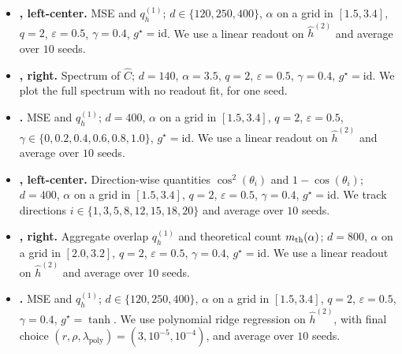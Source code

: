\documentclass[]{article}
\numberwithin{equation}{section}
\theoremstyle{definition}
\begin{document}
\begin{itemize}
    \setlength{\itemsep}{2pt}
    \setlength{\parsep}{0pt}
    \setlength{\topsep}{2pt}
    \setlength{\partopsep}{0pt}

    \item \textbf{, left-center.}
    MSE and $q_h^{(1)}$; $d\in\{120,250,400\}$, $\alpha$ on a grid in $[1.5,3.4]$,
    $q=2$, $\varepsilon=0.5$, $\gamma=0.4$, $g^\star=\mathrm{id}$.
    We use a linear readout on $\widehat h^{(2)}$ and average over $10$ seeds.

    \item \textbf{, right.}
    Spectrum of $\widehat C$; $d=140$, $\alpha=3.5$, $q=2$, $\varepsilon=0.5$,
    $\gamma=0.4$, $g^\star=\mathrm{id}$.
    We plot the full spectrum with no readout fit, for one seed.

    \item \textbf{.}
    MSE and $q_h^{(1)}$; $d=400$, $\alpha$ on a grid in $[1.5,3.4]$,
    $q=2$, $\varepsilon=0.5$,
    $\gamma\in\{0,0.2,0.4,0.6,0.8,1.0\}$, $g^\star=\mathrm{id}$.
    We use a linear readout on $\widehat h^{(2)}$ and average over $10$ seeds.

    \item \textbf{, left-center.}
    Direction-wise quantities $\cos^2(\theta_i)$ and $1-\cos(\theta_i)$;
    $d=400$, $\alpha$ on a grid in $[1.5,3.4]$, $q=2$, $\varepsilon=0.5$,
    $\gamma=0.4$, $g^\star=\mathrm{id}$.
    We track directions
    $i\in\{1,3,5,8,12,15,18,20\}$ and average over $10$ seeds.

    \item \textbf{, right.}
    Aggregate overlap $q_h^{(1)}$ and theoretical count $m_{\rm th}(\alpha)$;
    $d=800$, $\alpha$ on a grid in $[2.0,3.2]$, $q=2$, $\varepsilon=0.5$,
    $\gamma=0.4$, $g^\star=\mathrm{id}$.
    We use a linear readout on $\widehat h^{(2)}$ and average over $10$ seeds.

    \item \textbf{.}
    MSE and $q_h^{(1)}$; $d\in\{120,250,400\}$, $\alpha$ on a grid in $[1.5,3.4]$,
    $q=2$, $\varepsilon=0.5$, $\gamma=0.4$, $g^\star=\tanh$.
    We use polynomial ridge regression on $\widehat h^{(2)}$, with final choice
    $(r,\rho,\lambda_{\mathrm{poly}})=(3,10^{-5},10^{-4})$, and average over
    $10$ seeds.
\end{itemize}
\end{document}
